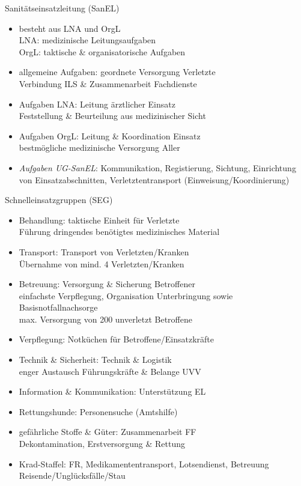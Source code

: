\begin{sectionbox}{Sanitätseinsatzleitung (SanEL)}
    \begin{itemize}
        \item besteht aus LNA und OrgL\\
        \ra LNA: medizinische Leitungsaufgaben\\
        \ra OrgL: taktische \& organisatorische Aufgaben
        \item allgemeine Aufgaben: geordnete Versorgung Verletzte\\
        \ra Verbindung ILS \& Zusammenarbeit Fachdienste  
        \item Aufgaben LNA: Leitung ärztlicher Einsatz\\
        \ra Feststellung \& Beurteilung aus medizinischer Sicht
        \item Aufgaben OrgL:  Leitung \& Koordination Einsatz\\
        \ra bestmögliche medizinische Versorgung Aller
        \item \emph{Aufgaben UG-SanEL}: Kommunikation, Registierung, Sichtung, Einrichtung von Einsatzabschnitten, Verletztentransport (Einweisung/Koordinierung)
    \end{itemize}
\end{sectionbox}
\begin{sectionbox}{Schnelleinsatzgruppen (SEG)}
    \begin{itemize}
        \item Behandlung: taktische Einheit für Verletzte\\
        \ra Führung dringendes benötigtes medizinisches Material
        \item Transport: Transport von Verletzten/Kranken\\
        \ra Übernahme von mind. 4 Verletzten/Kranken
        \item Betreuung: Versorgung \& Sicherung Betroffener\\
        \ra einfachste Verpflegung, Organisation Unterbringung sowie Basisnotfallnachsorge\\
        \ra max. Versorgung von 200 unverletzt Betroffene
        \item Verpflegung: Notküchen  für Betroffene/Einsatzkräfte
        \item Technik \& Sicherheit: Technik \& Logistik\\
        \ra enger Austausch Führungskräfte \& Belange UVV 
        \item Information \& Kommunikation: Unterstützung EL
        \item Rettungshunde: Personensuche (Amtshilfe)
        \item gefährliche Stoffe \& Güter: Zusammenarbeit FF\\
        \ra Dekontamination, Erstversorgung \& Rettung 
        \item Krad-Staffel: FR, Medikamententransport, Lotsendienst, Betreuung Reisende/Unglücksfälle/Stau 
    \end{itemize}
\end{sectionbox}
